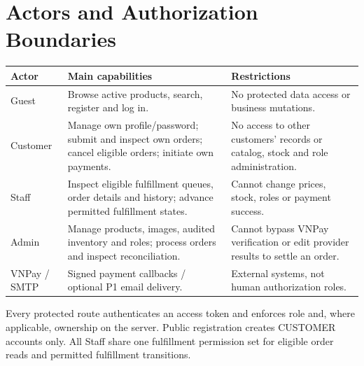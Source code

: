 \section{Actors and Authorization Boundaries}
\begin{tabularx}{\textwidth}{@{}p{23mm}XX@{}}
\toprule
Actor & Main capabilities & Restrictions \\
\midrule
Guest & Browse active products, search, register and log in. & No protected data access or business mutations. \\
Customer & Manage own profile/password; submit and inspect own orders; cancel eligible orders; initiate own payments. & No access to other customers' records or catalog, stock and role administration. \\
Staff & Inspect eligible fulfillment queues, order details and history; advance permitted fulfillment states. & Cannot change prices, stock, roles or payment success. \\
Admin & Manage products, images, audited inventory and roles; process orders and inspect reconciliation. & Cannot bypass VNPay verification or edit provider results to settle an order. \\
VNPay / SMTP & Signed payment callbacks / optional P1 email delivery. & External systems, not human authorization roles. \\
\bottomrule
\end{tabularx}

Every protected route authenticates an access token and enforces role and, where applicable, ownership on the server. Public registration creates CUSTOMER accounts only. All Staff share one fulfillment permission set for eligible order reads and permitted fulfillment transitions.
